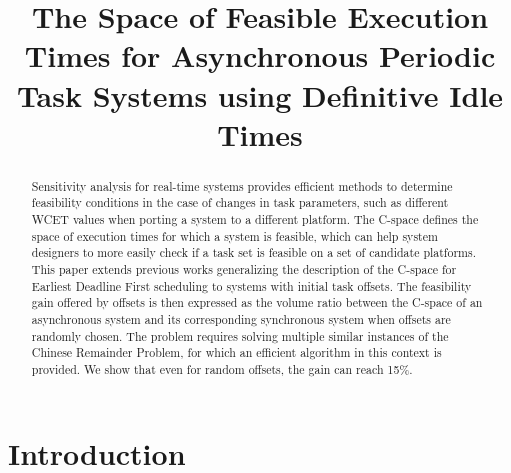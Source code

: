 \documentclass[conference]{IEEEtran}
\begin{document}
\title{The Space of Feasible Execution Times for Asynchronous Periodic Task
Systems using Definitive Idle Times}


\author{
\and
{}
\and
{}
}

\maketitle

\begin{abstract}
	Sensitivity analysis for real-time systems provides efficient methods to determine feasibility
	conditions in the case of changes in task parameters, such as
	different WCET values when porting a system to a different platform. The \mbox{C-space} defines the space of execution
	times for which a system is feasible, which can help system designers to more easily check
	if a task set is feasible on a set of candidate platforms. This paper extends previous works
	generalizing the description of the C-space for Earliest Deadline First
	scheduling to systems with initial task offsets. The feasibility gain offered
	by offsets is then expressed as the volume ratio between the C-space of an
	asynchronous system and its corresponding synchronous system when offsets are randomly chosen. The problem
	requires solving multiple similar instances of the Chinese Remainder Problem,
	for which an efficient algorithm in this context is provided. We show that even for random offsets, the gain can reach 15\%.
\end{abstract}

%

\section{Introduction}
\end{document}
